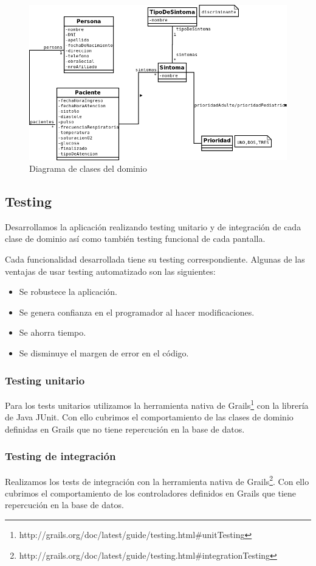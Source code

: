 \begin{figure}[h]
\centerline{\includegraphics[width=1.2\textwidth]{triage.png}}
\caption{Diagrama de clases del dominio}
\end{figure}

\subsection{Testing}
Desarrollamos la aplicación realizando testing unitario y de integración de cada clase de dominio así como también testing funcional de cada pantalla.

Cada funcionalidad desarrollada tiene su testing correspondiente. Algunas de las ventajas de usar testing automatizado son las siguientes:

\begin{itemize}
\item Se robustece la aplicación.
\item Se genera confianza en el programador al hacer modificaciones.
\item Se ahorra tiempo.
\item Se disminuye el margen de error en el código.
\end{itemize}

\subsubsection{Testing unitario}
Para los tests unitarios utilizamos la herramienta nativa de Grails\footnote{http://grails.org/doc/latest/guide/testing.html\#unitTesting} con la librería de Java JUnit. Con ello cubrimos el comportamiento de las clases de dominio definidas en Grails que no tiene repercución en la base de datos.

\subsubsection{Testing de integración}
Realizamos los tests de integración con la herramienta nativa de Grails\footnote{http://grails.org/doc/latest/guide/testing.html\#integrationTesting}. Con ello cubrimos el comportamiento de los controladores definidos en Grails que tiene repercución en la base de datos.

